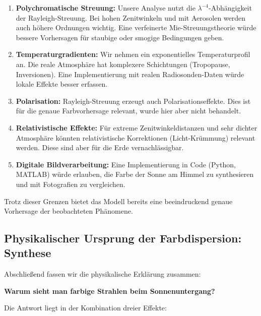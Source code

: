 \documentclass[12pt,a4paper]{article}
\begin{document}
\begin{enumerate}
	\item \textbf{Polychromatische Streuung:}
	Unsere Analyse nutzt die $\lambda^{-4}$-Abhängigkeit der Rayleigh-Streuung.
	Bei hohen Zenitwinkeln und mit Aerosolen werden auch höhere Ordnungen
	wichtig. Eine verfeinerte Mie-Streuungstheorie würde bessere Vorhersagen
	für staubige oder smogige Bedingungen geben.
	
	\item \textbf{Temperaturgradienten:}
	Wir nehmen ein exponentielles Temperaturprofil an. Die reale Atmosphäre
	hat komplexere Schichtungen (Tropopause, Inversionen). Eine Implementierung
	mit realen Radiosonden-Daten würde lokale Effekte besser erfassen.
	
	\item \textbf{Polarisation:}
	Rayleigh-Streuung erzeugt auch Polarisationseffekte. Dies ist für
	die genaue Farbvorhersage relevant, wurde hier aber nicht behandelt.
	
	\item \textbf{Relativistische Effekte:}
	Für extreme Zenitwinkeldistanzen und sehr dichter Atmosphäre könnten
	relativistische Korrektionen (Licht-Krümmung) relevant werden. Diese sind
	aber für die Erde vernachlässigbar.
	
	\item \textbf{Digitale Bildverarbeitung:}
	Eine Implementierung in Code (Python, MATLAB) würde erlauben, die
	Farbe der Sonne am Himmel zu synthesieren und mit Fotografien zu vergleichen.
\end{enumerate}

Trotz dieser Grenzen bietet das Modell bereits eine beeindruckend genaue
Vorhersage der beobachteten Phänomene.

\subsection{Physikalischer Ursprung der Farbdispersion: Synthese}
\label{subsec:synthesis}

Abschließend fassen wir die physikalische Erklärung zusammen:

\textbf{Warum sieht man farbige Strahlen beim Sonnenuntergang?}

Die Antwort liegt in der Kombination dreier Effekte:
\end{document}
